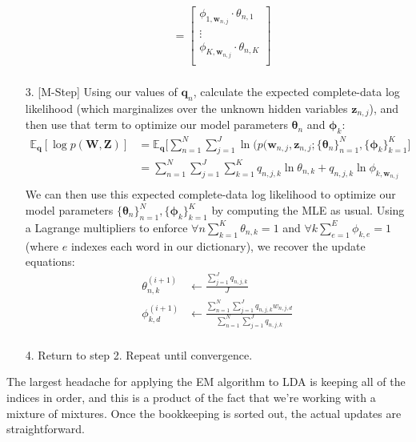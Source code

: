 \begin{itemize}
\begin{align*}
            &= \begin{bmatrix}
                \phi_{1, \textbf{w}_{n, j}} \cdot \theta_{n, 1} \\
                \vdots \\
                \phi_{K, \textbf{w}_{n, j}} \cdot \theta_{n, K} \\
            \end{bmatrix} \\
        \end{align*}
    \item[3.] [M-Step] Using our values of $\textbf{q}_n$, calculate the expected complete-data log likelihood (which marginalizes over the unknown hidden variables $\textbf{z}_{n, j}$), and then use that term to optimize our model parameters $\boldsymbol{\theta}_n$ and $\boldsymbol{\phi}_k$:
        \begin{align*}
            \mathbb{E}_{\textbf{q}}[\log p(\textbf{W}, \textbf{Z})] &= \mathbb{E}_{\textbf{q}} \bigg[ \sum_{n=1}^{N} \sum_{j=1}^{J} \ln(p(\textbf{w}_{n, j}, \textbf{z}_{n, j}; \{\boldsymbol{\theta}_n \}_{n=1}^{N}, \{ \boldsymbol{\phi}_k\}_{k=1}^{K} \bigg] \\
            &= \sum_{n=1}^{N} \sum_{j=1}^{J} \sum_{k=1}^{K} q_{n, j, k} \ln \theta_{n, k} + q_{n, j, k} \ln \phi_{k, \textbf{w}_{n, j}} \\
        \end{align*}
        We can then use this expected complete-data log likelihood to optimize our model parameters $\{\boldsymbol{\theta}_n \}_{n=1}^{N}, \{ \boldsymbol{\phi}_k\}_{k=1}^{K}$ by computing the MLE as usual. Using a Lagrange multipliers to enforce $\forall n \sum_{k=1}^{K} \theta_{n, k} = 1$ and $\forall k \sum_{e=1}^{E} \phi_{k, e} = 1$ (where $e$ indexes each word in our dictionary), we recover the update equations:
        \begin{align*}
            \theta_{n, k}^{(i + 1)} &\leftarrow \frac{\sum_{j=1}^{J} q_{n, j, k}}{J} \\
            \phi_{k, d}^{(i + 1)} &\leftarrow \frac{\sum_{n=1}^{N} \sum_{j=1}^{J} q_{n, j, k} w_{n, j, d}}{\sum_{n=1}^{N} \sum_{j=1}^{J} q_{n, j, k}} \\
        \end{align*}
    \item[4.] Return to step 2. Repeat until convergence.
\end{itemize}

The largest headache for applying the EM algorithm to LDA is keeping all of the indices in order, and this is a product of the fact that we're working with a mixture of mixtures. Once the bookkeeping is sorted out, the actual updates are straightforward.

